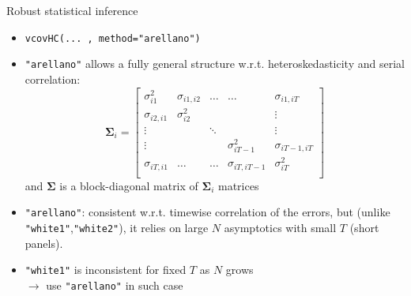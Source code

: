 \documentclass{beamer}
\begin{document}
\begin{frame}{Robust statistical inference}
\begin{itemize}
    \item \texttt{vcovHC(... , method="arellano")}
    \medskip
    \item \texttt{"arellano"} allows a fully general structure w.r.t. heteroskedasticity and serial correlation:
    $$
    \bm{\Sigma}_i = 
    \begin{bmatrix}
    \sigma_{i1}^2 & \sigma_{i1,i2} & \dots & \dots & \sigma_{i1,iT} \\
    \sigma_{i2,i1} & \sigma_{i2}^2 &       &       & \vdots \\
    \vdots         &               & \ddots &      & \vdots \\
   \vdots         &               &  &  \sigma_{iT-1}^2    & \sigma_{iT-1,iT} \\
   \sigma_{iT,i1}       &   \dots & \dots    &  \sigma_{iT,iT-1}    & \sigma_{iT}^2 \\
    \end{bmatrix}
    $$
    and $\bm{\Sigma}$ is a block-diagonal matrix of $\bm{\Sigma}_i$ matrices
    \smallskip
    \item \texttt{"arellano"}: consistent w.r.t. timewise correlation of the errors, but (unlike \texttt{"white1"},\texttt{"white2"}), it relies on large $N$ asymptotics with small $T$ (short panels).
    \smallskip
    \item \texttt{"white1"} is inconsistent for fixed $T$ as $N$ grows \\$\rightarrow$ use \texttt{"arellano"} in such case 
\end{itemize}
\end{frame}
\end{document}
